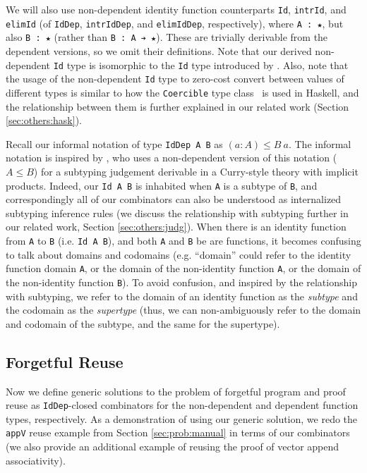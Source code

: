 \documentclass[acmsmall]{acmart}\settopmatter{}
\newcommand{\refsec}[1]{Section \ref{sec:#1}}
\newcommand{\labsec}[1]{\label{sec:#1}}
\begin{document}
We will also use non-dependent identity function counterparts
\verb;Id;, \verb;intrId;, and \verb;elimId;
(of \verb;IdDep;, \verb;intrIdDep;, and \verb;elimIdDep;, respectively),
where \verb;A : ★;, but also \verb;B : ★; (rather than \verb;B : A ➔ ★;).
These are trivially derivable from the dependent versions, so we
omit their definitions. Note that our derived non-dependent \verb;Id;
type is isomorphic to the \verb;Id; type introduced by
\citet{firsov18b}. Also, note that the usage of the non-dependent
\verb;Id; type to zero-cost convert between values of different types
is similar to how the \verb;Coercible; type class~\cite{breitner+16}
is used in Haskell, and the relationship between them is further
explained in our related work (\refsec{others:hask}).

Recall our informal notation of type
\verb;IdDep A B; as $(a : A) \leq B~a$.
The informal notation is
inspired by \citet{miquel01}, who uses a non-dependent version
of this notation ($A \leq B$) for a
subtyping judgement derivable in a Curry-style theory with implicit
products. Indeed, our \verb;Id A B; is inhabited when
\verb;A; is a subtype of \verb;B;, and correspondingly all of
our combinators can also be understood as internalized subtyping
inference rules (we discuss the relationship with subtyping further in
our related work, \refsec{others:judg}).
When there is an identity function
from \verb;A; to \verb;B; (i.e. \verb;Id A B;), and both
\verb;A; and \verb;B; be are functions, it becomes confusing to talk
about domains and codomains (e.g. ``domain'' could refer to the
identity function domain \verb;A;, or the
domain of the non-identity function \verb;A;,
or the domain of the non-identity function \verb;B;). To avoid confusion,
and inspired by the relationship with subtyping, we refer to the
domain of an identity function as the \textit{subtype} and the
codomain as the \textit{supertype} (thus, we can non-ambiguously refer
to the domain and codomain of the subtype, and the same for the supertype).

\subsection{Forgetful Reuse}
\labsec{prog:fog}

Now we define generic solutions to the problem of
forgetful program and proof reuse as \verb;IdDep;-closed
combinators for the non-dependent and dependent function types,
respectively. As a demonstration of using our generic solution,
we redo the \verb;appV; reuse example from \refsec{prob:manual} in
terms of our combinators (we also provide an additional example of
reusing the proof of vector append associativity).
\end{document}
